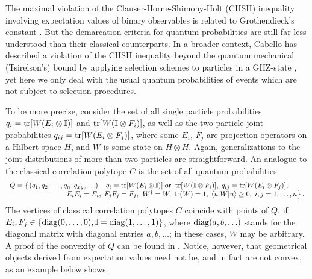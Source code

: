 \documentclass[pra,showpacs,showkeys,amsfonts]{revtex4}
\begin{document}

The maximal violation of the
Clauser-Horne-Shimony-Holt (CHSH) inequality involving expectation values of
binary observables is related to Grothendieck's constant
\cite{fishburn-reeds-1994}. But the demarcation criteria for quantum
probabilities are still far less understood than their classical
counterparts.
In a broader context, Cabello has described a
violation of the CHSH inequality beyond the quantum mechanical (Tsirelson's)
bound by applying selection schemes to particles in a GHZ-state
\cite{cabello-02a,cabello-02b}, yet here we only deal with the usual quantum probabilities of events
which are not subject to selection procedures.


To be more precise,
consider the set of all  single particle
probabilities
$q_{i}={\rm tr}[W(E_{i}\otimes {\Bbb I})]$
and
${\rm tr}[W({\Bbb I}\otimes F_{i})]$,
as well as the two particle joint probabilities
$q_{ij}={\rm tr}[W(E_{i}\otimes F_{j})]$, where some $E_{i}$,
$F_{j}$ are projection operators on a Hilbert space $H$,
and $W$ is some state on $H\otimes H$.
Again, generalizations to the joint distributions of more than two particles are straightforward.
An analogue to the classical correlation polytope  $C$
is the set of all quantum probabilities
\begin{equation}
\label{e-2003-qpoly-Q}
\begin{array}{l}
Q
= \left\{
\left.
\large(q_1, q_2,\ldots , q_n, q_{xy},\ldots \large)
\; \right| \right.\;
q_{i}={\rm tr}[W(E_{i}\otimes {\Bbb I})]\;{\rm or}\;\;{\rm tr}[W({\Bbb I}\otimes F_{i})],\; q_{ij}={\rm tr}[W(E_{i}\otimes F_{j})],\;  \\
\qquad\qquad
\qquad\qquad
E_{i}E_{i}=E_{i},\; F_{j}F_{j}=F_{j},\;
\left.
W^\dagger =W,\; {\rm tr} (W)=1,\;
\langle u | W | u \rangle \ge 0,\;
i,j=1,\ldots ,n
\right\}.
\end{array}\nonumber
\end{equation}
The vertices of classical correlation polytopes $C$
coincide with points of $Q$,
if $E_i,F_j\in \{{\rm diag}(0,\ldots ,0),{\Bbb I}={\rm diag}(1,\ldots ,1)\}$, where
${\rm diag}(a,b,\ldots )$ stands for the diagonal matrix
with diagonal entries $a,b,\ldots $;
in these cases, $W$ may be arbitrary.
A proof of the convexity of $Q$ can be found in  \cite{pit:range-2001}.
Notice, however, that geometrical objects derived from expectation values
need not be, and in fact are not convex, as an example below shows.
\end{document}
